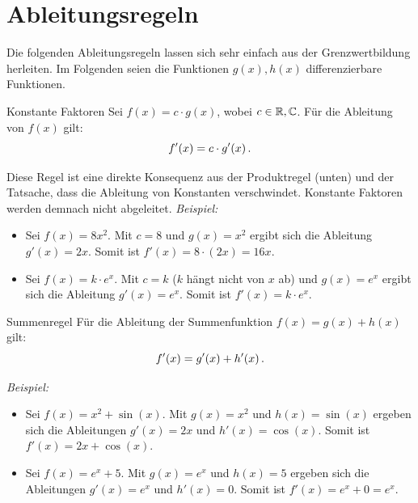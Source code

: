 \section{Ableitungsregeln}\label{sec: Ableitungsregeln}
Die folgenden Ableitungsregeln lassen sich sehr einfach aus der Grenzwertbildung herleiten. Im Folgenden seien die Funktionen $g(x), h(x)$ differenzierbare Funktionen.  
\begin{rememberbox}[]{Konstante Faktoren}
Sei $f(x) = c\cdot g(x)$, wobei $c \in \mathbb{R}, \mathbb{C}$. Für die Ableitung von $f(x)$ gilt:
\begin{equation}
f'(x) = c \cdot g'(x) \,.
\end{equation}
\end{rememberbox}
Diese Regel ist eine direkte Konsequenz aus der Produktregel (unten) und der Tatsache, dass die Ableitung von Konstanten verschwindet. Konstante Faktoren werden demnach nicht abgeleitet.\newline
\textit{Beispiel:}
\begin{itemize}
    \item Sei $f(x) = 8 x^2$. Mit $c = 8$ und $g(x) = x^2$ ergibt sich die Ableitung $g'(x) = 2x$. \newline
    Somit ist $f'(x) = 8\cdot (2x) = 16 x$.
    \item Sei $f(x) = k\cdot e^x$. Mit $c = k$ ($k$ hängt nicht von $x$ ab) und $g(x) = e^x$ ergibt sich die Ableitung $g'(x) = e^x$.\newline
    Somit ist $f'(x) = k\cdot e^x$.
\end{itemize}
\begin{rememberbox}[]{Summenregel}
Für die Ableitung der Summenfunktion $f(x) = g(x) + h(x)$ gilt:
\begin{equation}
f'(x) = g'(x) + h'(x) \,.
\end{equation}
\end{rememberbox}
\textit{Beispiel:}
\begin{itemize}
    \item Sei $f(x) = x^2 + \sin(x)$. Mit $g(x) = x^2$ und $h(x) = \sin(x)$ ergeben sich die Ableitungen $g'(x) = 2x$ und $h'(x) = \cos(x)$. \newline
    Somit ist $f'(x) = 2x + \cos(x)$.
    \item Sei $f(x) = e^x + 5$. Mit $g(x) = e^x$ und $h(x) = 5$ ergeben sich die Ableitungen $g'(x) = e^x$ und $h'(x) = 0$.\newline
    Somit ist $f'(x) = e^x + 0 = e^x$.
\end{itemize}

